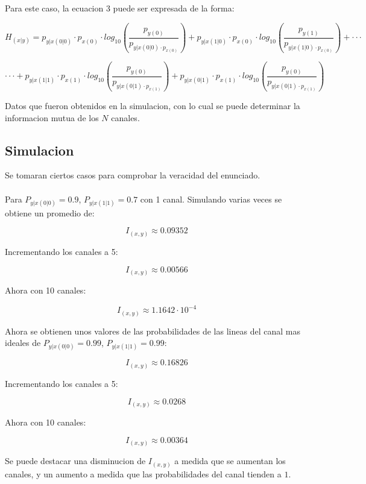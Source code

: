 Para este caso, la ecuacion 3 puede ser expresada de la forma:

\begin{equation*}
    H_{(x|y)} = p_{y|x(0|0)}\cdot p_{x(0)}\cdot log_{10}\left(\frac{p_{y(0)}}{p_{y|x(0|0)\cdot p_{x(0)}}}\right)
    +
    p_{y|x(1|0)}\cdot p_{x(0)}\cdot log_{10}\left(\frac{p_{y(1)}}{p_{y|x(1|0)\cdot p_{x(0)}}}\right)+\cdot \cdot \cdot
\end{equation*}

\begin{equation*}
    \cdot \cdot \cdot
    +
    p_{y|x(1|1)}\cdot p_{x(1)}\cdot log_{10}\left(\frac{p_{y(0)}}{p_{y|x(0|1)\cdot p_{x(1)}}}\right)
    +
    p_{y|x(0|1)}\cdot p_{x(1)}\cdot log_{10}\left(\frac{p_{y(0)}}{p_{y|x(0|1)\cdot p_{x(1)}}}\right)
\end{equation*}

Datos que fueron obtenidos en la simulacion, con lo cual se puede determinar la informacion mutua de los $N$ canales.

\subsection{Simulacion}

Se tomaran ciertos casos para comprobar la veracidad del enunciado.
\\
\\
Para $P_{y|x(0|0)} = 0.9$, $P_{y|x(1|1)} = 0.7$ con 1 canal. Simulando varias veces se obtiene un promedio de:

\begin{equation*}
    I_{(x,y)}\approx 0.09352
\end{equation*}

Incrementando los canales a 5:

\begin{equation*}
    I_{(x,y)}\approx 0.00566
\end{equation*}

Ahora con 10 canales:

\begin{equation*}
    I_{(x,y)}\approx 1.1642\cdot 10^{-4}
\end{equation*}

Ahora se obtienen unos valores de las probabilidades de las lineas del canal mas ideales de $P_{y|x(0|0)} = 0.99$, $P_{y|x(1|1)} = 0.99$:

\begin{equation*}
    I_{(x,y)}\approx 0.16826
\end{equation*}

Incrementando los canales a 5:

\begin{equation*}
    I_{(x,y)}\approx 0.0268
\end{equation*}

Ahora con 10 canales:

\begin{equation*}
    I_{(x,y)}\approx 0.00364
\end{equation*}

Se puede destacar una disminucion de $I_{(x,y)}$ a medida que se aumentan los canales, y un aumento a medida que las probabilidades del canal tienden a $1$.
